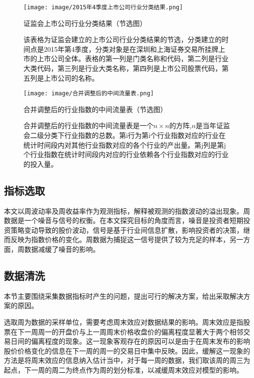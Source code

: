 \documentclass{sysuthesis}
\begin{document}
  \begin{figure}[h!tbp]
  \centering
  \texttt{[image: image/2015年4季度上市公司行业分类结果.png]}
  \caption{证监会上市公司行业分类结果（节选图）}
  \caption*{\footnotesize 该表格为证监会建立的上市公司行业分类结果的节选，分类建立的时间点是2015年第4季度，分类对象是在深圳和上海证券交易所挂牌上市的上市公司全体。表格的第一列是门类名称和代码，第二列是行业大类代码，第三列是行业大类名称，第四列是上市公司股票代码，第五列是上市公司的名称。}
  \label{fig:classify-output}
  \end{figure}

  \begin{figure}[htbp]
  \centering
  \texttt{[image: image/合并调整后的中间流量表.png]}
  \caption{合并调整后的行业指数的中间流量表（节选图）}
  \caption*{\footnotesize 合并调整后的行业指数的中间流量表是一个$n \times n$的方阵,$n$是当年证监会二级分类下行业指数的总数。第i行为第i个行业指数对应的行业在统计时间段内对其他行业指数对应的各个行业的产出量。第j列是第j个行业指数在统计时间段内对应的行业依赖各个行业指数对应的行业的投入量。}
  \label{fig:reorganized-ioaccount}
  \end{figure}

\subsection {指标选取} 
本文以周波动率及周收益率作为观测指标，解释被观测的指数波动的溢出现象。周数据是一个噪音与信号的权衡。在本文探究目标的角度而言，噪音是投资者短期投资策略变动导致的股价波动，信号是基于行业间信息扩散，影响投资者的决策，继而反映为指数价格的变化。周数据为捕捉这一信号提供了较为充足的样本，另一方面，周数据减缓了噪音的影响。

\subsection {数据清洗}
本节主要围绕采集数据指标时产生的问题，提出可行的解决方案，给出采取解决方案的原因。

选取周为数据的采样单位，需要考虑周末效应对数据结果的影响。周末效应是指股票在下一周周一的开盘价与上一周周末价格收盘价的偏离程度显著大于两个相邻交易日间的偏离程度的现象。这一现象客观存在的原因可以是由于在周末发布的影响股价价格变化的信息在下一周的周一的交易日中集中反映。因此，缓解这一现象的方法是将周末效应的信息纳入估计当中，对于每一周的数据，我们取该周的周三为起点，下一周的周二为终点作为周的划分标准，以减缓周末效应对模型的影响。
\end{document}
